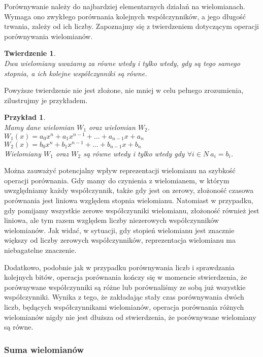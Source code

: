 \documentclass[twoside,a4paper]{book}
\newtheorem{theorem}{Twierdzenie}
\newtheorem{example}{Przykład}
\begin{document}
Porównywanie należy do najbardziej elementarnych działań na wielomianach. Wymaga ono zwykłego porównania kolejnych współczynników, a jego długość trwania, zależy od ich liczby. Zapoznajmy się z twierdzeniem dotyczącym operacji porównywania wielomianów.

\begin{theorem}
	$ $\\
	Dwa wielomiany uważamy za równe wtedy i tylko wtedy, gdy są tego samego stopnia, a ich kolejne współczynniki są równe.
\end{theorem}

Powyższe twierdzenie nie jest złożone, nie mniej w celu pełnego zrozumienia, zilustrujmy je przykładem. 

\begin{example}
	$ $\\
	Mamy dane wielomian $W_1$ oraz wielomian $W_2$. \\
	$W_1(x) = a_0x^n + a_1x^{n-1} + ... + a_{n-1}x + a_n$ \\
	$W_2(x) = b_0x^n + b_1x^{n-1} + ... + b_{n-1}x + b_n$ \\
	Wielomiany $W_1$ oraz $W_2 $ są równe wtedy i tylko wtedy gdy
	$\forall{i\in N}\ a_i = b_i$.
\end{example}

Można zauważyć potencjalny wpływ reprezentacji wielomianu na szybkość operacji porównania. Gdy mamy do czynienia z wielomianem, w którym uwzględniamy każdy współczynnik, także gdy jest on zerowy, złożoność czasowa porównania jest liniowa względem stopnia wielomianu. Natomiast w przypadku, gdy pomijamy wszystkie zerowe współczynniki wielomianu, złożoność również jest liniowa, ale tym razem względem liczby niezerowych współczynników wielomianów. Jak widać, w sytuacji, gdy stopień wielomianu jest znacznie większy od liczby zerowych współczynników, reprezentacja wielomianu ma niebagatelne znaczenie.

Dodatkowo, podobnie jak w przypadku porównywania liczb i sprawdzania kolejnych bitów, operacja porównania kończy się w momencie stwierdzenia, że porównywane współczynniki są różne lub porównaliśmy ze sobą już wszystkie współczynniki. Wynika z tego, że zakładając stały czas porównywania dwóch liczb, będących współczynnikami wielomianów, operacja porównania różnych wielomianów nigdy nie jest dłuższa od stwierdzenia, że porównywane wielomiany są równe.

\subsubsection{Suma wielomianów}
\end{document}
